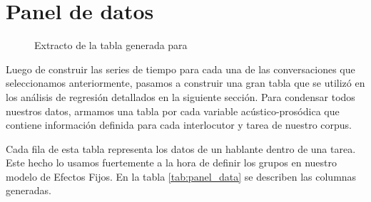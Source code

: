 \section{Panel de datos}
\label{sec:panel_data}


\begin{figure}[t!]
\centering

\caption{Extracto de la tabla generada para \FOMEAN}
\label{tab:panel_data_example}
\end{figure}


Luego de construir las series de tiempo para cada una de las conversaciones que seleccionamos anteriormente, pasamos a construir una gran tabla que se utilizó en los análisis de regresión detallados en la siguiente sección. Para condensar todos nuestros datos, armamos una tabla por cada variable acústico-prosódica que contiene información definida para cada interlocutor y tarea de nuestro corpus.

Cada fila de esta tabla representa los datos de un hablante dentro de una tarea. Este hecho lo usamos fuertemente a la hora de definir los grupos en nuestro modelo de Efectos Fijos. En la tabla \ref{tab:panel_data} se describen las columnas generadas.

